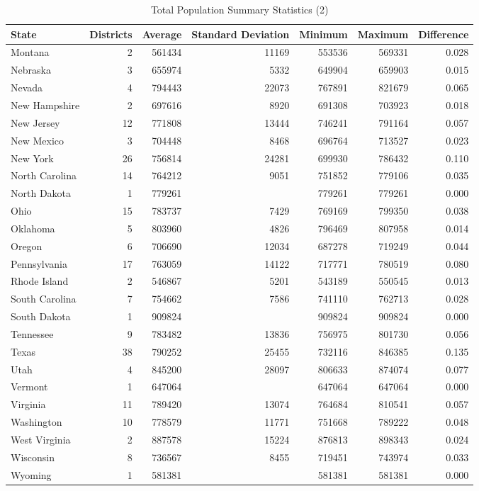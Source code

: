 \documentclass[12pt]{article}
\begin{document}
	\begin{table}[ht]
		\centering
		\begin{adjustbox}{max width=\textwidth}
		\begin{tabular}{lrrrrrr}
		  \hline
		  State & Districts & Average  & Standard Deviation & Minimum & Maximum & Difference \\ 
	  \hline
		  Montana & 2 & 561434 & 11169 & 553536 & 569331 & 0.028 \\ 
	   Nebraska & 3 & 655974 & 5332 & 649904 & 659903 & 0.015 \\ 
	   Nevada & 4 & 794443 & 22073 & 767891 & 821679 & 0.065 \\ 
	   New Hampshire & 2 & 697616 & 8920 & 691308 & 703923 & 0.018 \\ 
	  New Jersey & 12 & 771808 & 13444 & 746241 & 791164 & 0.057 \\ 
	  New Mexico & 3 & 704448 & 8468 & 696764 & 713527 & 0.023 \\ 
	   New York & 26 & 756814 & 24281 & 699930 & 786432 & 0.110 \\ 
	  North Carolina & 14 & 764212 & 9051 & 751852 & 779106 & 0.035 \\ 
	 North Dakota & 1 & 779261 &  & 779261 & 779261 & 0.000 \\ 
	   Ohio & 15 & 783737 & 7429 & 769169 & 799350 & 0.038 \\ 
	   Oklahoma & 5 & 803960 & 4826 & 796469 & 807958 & 0.014 \\ 
	   Oregon & 6 & 706690 & 12034 & 687278 & 719249 & 0.044 \\ 
	  Pennsylvania & 17 & 763059 & 14122 & 717771 & 780519 & 0.080 \\ 
	  Rhode Island & 2 & 546867 & 5201 & 543189 & 550545 & 0.013 \\ 
	 South Carolina & 7 & 754662 & 7586 & 741110 & 762713 & 0.028 \\ 
	  South Dakota & 1 & 909824 &  & 909824 & 909824 & 0.000 \\ 
	   Tennessee & 9 & 783482 & 13836 & 756975 & 801730 & 0.056 \\ 
	   Texas & 38 & 790252 & 25455 & 732116 & 846385 & 0.135 \\ 
	  Utah & 4 & 845200 & 28097 & 806633 & 874074 & 0.077 \\ 
	   Vermont & 1 & 647064 &  & 647064 & 647064 & 0.000 \\ 
	   Virginia & 11 & 789420 & 13074 & 764684 & 810541 & 0.057 \\ 
	   Washington & 10 & 778579 & 11771 & 751668 & 789222 & 0.048 \\ 
	   West Virginia & 2 & 887578 & 15224 & 876813 & 898343 & 0.024 \\ 
	  Wisconsin & 8 & 736567 & 8455 & 719451 & 743974 & 0.033 \\ 
	   Wyoming & 1 & 581381 &  & 581381 & 581381 & 0.000 \\ 
		  \hline
		  
		\end{tabular}
	\end{adjustbox}
		\label{total_pop_stats2}
		\caption{Total Population Summary Statistics (2)}
	\end{table}
\end{document}
